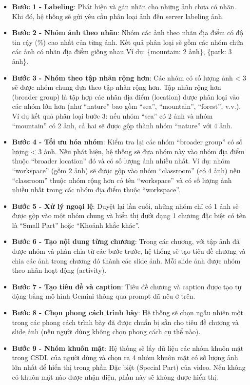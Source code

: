\begin{itemize}
    \item \textbf{Bước 1 - Labeling}: Phát hiện và gán nhãn cho những ảnh chưa có nhãn. Khi đó, hệ thống sẽ gửi yêu cầu phân loại ảnh đến server labeling ảnh. 
    
    \item \textbf{Bước 2 - Nhóm ảnh theo nhãn}: Nhóm các ảnh theo nhãn địa điểm có độ tin cậy (\%) cao nhất của từng ảnh. Kết quả phân loại sẽ gồm các nhóm chứa các ảnh có nhãn địa điểm giống nhau
    Ví dụ: \{mountain: 2 ảnh\}, \{park: 3 ảnh\}.
    
    \item \textbf{Bước 3 - Nhóm theo tập nhãn rộng hơn}: Các nhóm có số lượng ảnh < 3 sẽ được nhóm chung dựa theo tập nhãn rộng hơn. Tập nhãn rộng hơn (broader group) là tập hợp các nhãn địa điểm (location) được phân loại vào các nhóm lớn hơn (như ``nature'' bao gồm ``sea'', ``mountain'', ``forest'', v.v.). Ví dụ kết quả phân loại bước 3: nếu nhóm ``sea'' có 2 ảnh và nhóm ``mountain'' có 2 ảnh, cả hai sẽ được gộp thành nhóm ``nature'' với 4 ảnh.
    
    \item \textbf{Bước 4 - Tối ưu hóa nhóm}: Kiểm tra lại các nhóm ``broader group'' có số lượng < 3 ảnh. Nếu phát hiện, hệ thống sẽ đưa nhóm này vào nhóm địa điểm thuộc ``broader location'' đó và có số lượng ảnh nhiều nhất. Ví dụ: nhóm ``workspace'' (gồm 2 ảnh) sẽ được gộp vào nhóm ``classroom'' (có 4 ảnh) nếu ``classroom'' thuộc nhóm rộng hơn có tên ``workspace'' và có số lượng ảnh nhiều nhất trong các nhóm địa điểm thuộc ``workspace''.
     
    \item \textbf{Bước 5 - Xử lý ngoại lệ}: Duyệt lại lần cuối, những nhóm chỉ có 1 ảnh sẽ được gộp vào một nhóm chung và hiển thị dưới dạng 1 chương đặc biệt có tên là ``Small Part'' hoặc ``Khoảnh khắc khác''.
    \item \textbf{Bước 6 - Tạo nội dung từng chương}: Trong các chương, với tập ảnh đã được nhóm và phân chia từ các bước trước, hệ thống sẽ tạo tiêu đề chương và chia các ảnh trong chương đó thành các slide ảnh. Mỗi slide ảnh được nhóm theo nhãn hoạt động (activity). 
    \item \textbf{Bước 7 - Tạo tiêu đề và caption}: Tiêu đề chương và caption được tạo tự động bằng mô hình Gemini thông qua prompt đã nêu ở trên. 
    \item \textbf{Bước 8 - Chọn phong cách trình bày}: Hệ thống sẽ chọn ngẫu nhiên một trong các phong cách trình bày đã được chuẩn bị sẵn cho tiêu đề chương và slide ảnh (nếu người dùng không chọn phong cách cụ thể nào).
    \item \textbf{Bước 9 - Nhóm khuôn mặt}: Hệ thống sẽ lấy dữ liệu các nhóm khuôn mặt trong CSDL của người dùng và chọn ra 4 nhóm khuôn mặt có số lượng ảnh lớn nhất để hiển thị trong phần Đặc biệt (Special Part) của video. Nếu không có khuôn mặt nào được nhận diện, phần này sẽ không được hiển thị.
\end{itemize}


